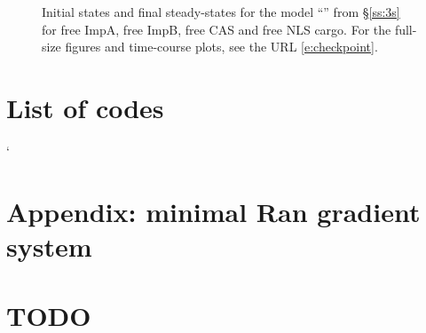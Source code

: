 \documentclass[12pt,notitlepage]{article}
\begin{document}
\begin{figure}[!p]
	\vspace{\baselineskip}
		
	\caption{%
		Initial states and final steady-states for the model 
		``'' from \S\ref{ss:3s}
		for 
		free ImpA, free ImpB, free CAS and free NLS cargo.
		For the full-size figures and time-course plots, see the URL \eqref{e:checkpoint}.
	}
	\label{f:app:3s-plot-ss}
\end{figure}




%





\renewcommand*{\bibfont}{\normalfont\small}
\printbibliography %


\section*{List of codes}

\begin{center}
\SHOWCODES
\end{center}



`\clearpage

\section{Appendix: minimal Ran gradient system} \label{s:app:gsr-ran}









\clearpage

\section{TODO}
\SHOWTODOS



\leavevmode\vfill{\tiny\color{lightgray}\hfill{\DTMnow}}
\end{document}
